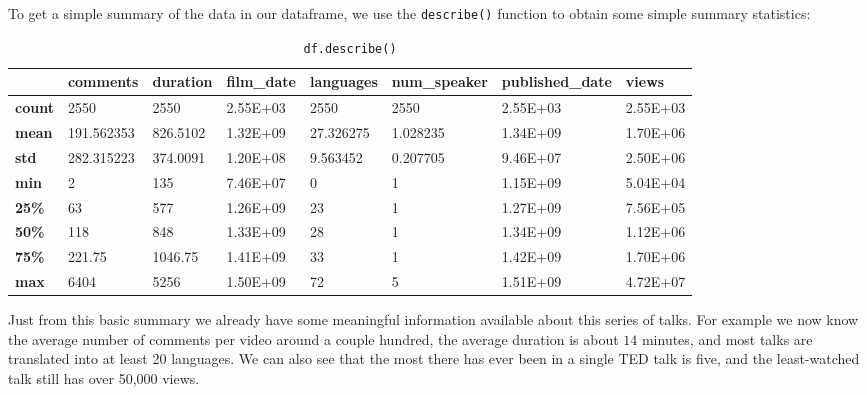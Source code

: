 \documentclass[11pt,oneside,reqno]{amsart}
\theoremstyle{plain}
\theoremstyle{definition}
\theoremstyle{remark}
\newcommand{\inlinecode}{\texttt}
\begin{document}
To get a simple summary of the data in our dataframe, we use the \inlinecode{describe()} function to obtain some simple summary statistics: 
\begin{table}[H]
\begin{adjustbox}{center}
  \scriptsize
  \centering
  
    \begin{tabular}{@{}p{2.345em}lllllll@{}} 
    
    \toprule
    \multicolumn{1}{c}{} & \multicolumn{1}{p{5.59em}}{\textbf{comments}} & \multicolumn{1}{p{4.225em}}{\textbf{duration}} & \multicolumn{1}{p{5.045em}}{\textbf{film\_date}} & \multicolumn{1}{p{5.725em}}{\textbf{languages}} & \multicolumn{1}{p{7.635em}}{\textbf{num\_speaker}} & \multicolumn{1}{p{8.225em}}{\textbf{published\_date}} & \multicolumn{1}{p{4.045em}}{\textbf{views}} \\
    \midrule
    \textbf{count} & 2550  & 2550  & 2.55E+03 & 2550  & 2550  & 2.55E+03 & 2.55E+03 \\
    \textbf{mean} & 191.562353 & 826.5102 & 1.32E+09 & 27.326275 & 1.028235 & 1.34E+09 & 1.70E+06 \\
    \textbf{std} & 282.315223 & 374.0091 & 1.20E+08 & 9.563452 & 0.207705 & 9.46E+07 & 2.50E+06 \\
    \textbf{min} & 2     & 135   & 7.46E+07 & 0     & 1     & 1.15E+09 & 5.04E+04 \\
    \textbf{25\%} & 63    & 577   & 1.26E+09 & 23    & 1     & 1.27E+09 & 7.56E+05 \\
    \textbf{50\%}& 118   & 848   & 1.33E+09 & 28    & 1     & 1.34E+09 & 1.12E+06 \\
    \textbf{75\%} & 221.75 & 1046.75 & 1.41E+09 & 33    & 1     & 1.42E+09 & 1.70E+06 \\
    \textbf{max} & 6404  & 5256  & 1.50E+09 & 72    & 5     & 1.51E+09 & 4.72E+07 \\
    \bottomrule
    \end{tabular}%
  \label{table1}
  
\end{adjustbox}
\caption{\inlinecode{df.describe()}}
\end{table}
Just from this basic summary we already have some meaningful information available about this series of talks. For example we now know the average number of comments per video around a couple hundred, the average duration is about $14$ minutes, and most talks are translated into at least 20 languages. We can also see that the most there has ever been in a single TED talk is five, and the least-watched talk still has over 50,000 views. 
\end{document}
